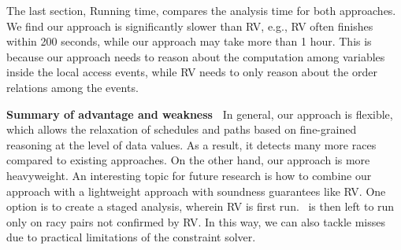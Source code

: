 The last section, Running time, compares the analysis time for both approaches. We find our approach is significantly slower than {\sf RV}, e.g., {\sf RV} often finishes within 200 seconds, while our approach may take more than 1 hour. This is because our approach needs to reason about the computation among variables inside the local access events, while {\sf RV} needs to only reason about the order relations among the events.

{\bf Summary of advantage and weakness\ } In general, our approach is flexible, which allows the relaxation of schedules and paths based on  fine-grained reasoning at the level of data values. As a result, it detects many more races compared to existing approaches. On the other hand, our approach is more heavyweight. An interesting topic for future research is how  to combine our approach with a lightweight approach with soundness guarantees like {\sf RV}. One option is to create a staged analysis, wherein {\sf RV} is first run. \tool\ is then left to run only on racy pairs not confirmed by {\sf RV}.
In this way, we can also tackle misses due to practical limitations of the constraint solver.
 













